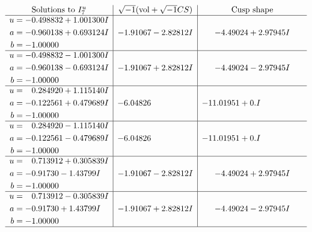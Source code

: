 \documentclass[1p]{elsarticle_modified}
\theoremstyle{definition}
\newcommand{\I}{\sqrt{-1}}
\begin{document}
$$\begin{array}{c|c|c}  
\text{Solutions to }I^u_{7}& \I (\text{vol} + \sqrt{-1}CS) & \text{Cusp shape}\\
 \hline 
\begin{aligned}
u &= -0.498832 + 1.001300 I \\
a &= -0.960138 + 0.693124 I \\
b &= -1.00000\phantom{ +0.000000I}\end{aligned}
 & -1.91067 - 2.82812 I & -4.49024 + 2.97945 I \\ \hline\begin{aligned}
u &= -0.498832 - 1.001300 I \\
a &= -0.960138 - 0.693124 I \\
b &= -1.00000\phantom{ +0.000000I}\end{aligned}
 & -1.91067 + 2.82812 I & -4.49024 - 2.97945 I \\ \hline\begin{aligned}
u &= \phantom{-}0.284920 + 1.115140 I \\
a &= -0.122561 + 0.479689 I \\
b &= -1.00000\phantom{ +0.000000I}\end{aligned}
 & -6.04826\phantom{ +0.000000I} & -11.01951 + 0. I\phantom{ +0.000000I} \\ \hline\begin{aligned}
u &= \phantom{-}0.284920 - 1.115140 I \\
a &= -0.122561 - 0.479689 I \\
b &= -1.00000\phantom{ +0.000000I}\end{aligned}
 & -6.04826\phantom{ +0.000000I} & -11.01951 + 0. I\phantom{ +0.000000I} \\ \hline\begin{aligned}
u &= \phantom{-}0.713912 + 0.305839 I \\
a &= -0.91730 - 1.43799 I \\
b &= -1.00000\phantom{ +0.000000I}\end{aligned}
 & -1.91067 - 2.82812 I & -4.49024 + 2.97945 I \\ \hline\begin{aligned}
u &= \phantom{-}0.713912 - 0.305839 I \\
a &= -0.91730 + 1.43799 I \\
b &= -1.00000\phantom{ +0.000000I}\end{aligned}
 & -1.91067 + 2.82812 I & -4.49024 - 2.97945 I\\
 \hline 
 \end{array}$$\newpage
\end{document}
